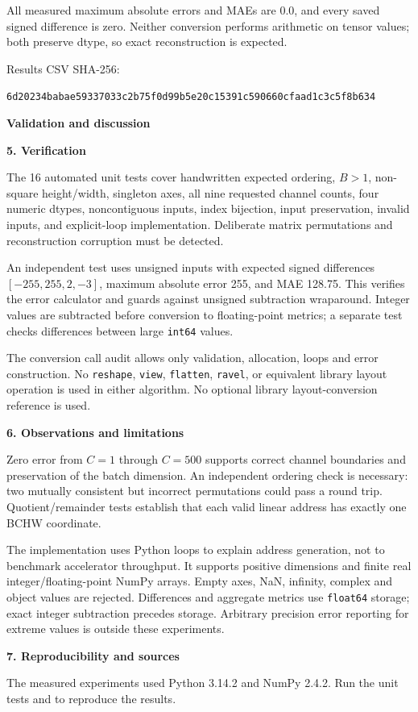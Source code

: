 \documentclass[11pt,a4paper]{article}
\newcommand{\reporttitle}[1]{{\LARGE\sffamily\bfseries\color{navy}#1}\par\medskip}
\newcommand{\reportsection}[1]{{\large\sffamily\bfseries\color{teal}#1}\par}
\newcommand{\ResultsSHA}{6d20234babae59337033c2b75f0d99b5e20c15391c590660cfaad1c3c5f8b634}
\newcommand{\PythonVersion}{3.14.2}
\newcommand{\NumpyVersion}{2.4.2}
\begin{document}
All measured maximum absolute errors and MAEs are 0.0, and every saved signed
difference is zero. Neither conversion performs arithmetic on tensor values;
both preserve dtype, so exact reconstruction is expected.

\vfill
{\footnotesize Results CSV SHA-256:\par\scriptsize\texttt{\ResultsSHA}}

\newpage
\reporttitle{Validation and discussion}
\reportsection{5. Verification}
The 16 automated unit tests cover handwritten expected ordering, $B>1$,
non-square height/width, singleton axes, all nine requested channel counts,
four numeric dtypes, noncontiguous inputs, index bijection, input preservation,
invalid inputs, and explicit-loop implementation. Deliberate matrix permutations
and reconstruction corruption must be detected.

An independent test uses unsigned inputs with expected signed differences
$[-255,255,2,-3]$, maximum absolute error 255, and MAE 128.75.
This verifies the error calculator and guards against unsigned subtraction
wraparound. Integer values are subtracted before conversion to floating-point
metrics; a separate test checks differences between large \texttt{int64} values.

The conversion call audit allows only validation, allocation, loops and error
construction. No \texttt{reshape}, \texttt{view}, \texttt{flatten}, \texttt{ravel},
or equivalent library layout operation is used in either algorithm. No optional
library layout-conversion reference is used.

\reportsection{6. Observations and limitations}
Zero error from $C=1$ through $C=500$ supports correct channel boundaries and
preservation of the batch dimension. An independent ordering check is necessary:
two mutually consistent but incorrect permutations could pass a round trip.
Quotient/remainder tests establish that each valid linear address has exactly
one BCHW coordinate.

The implementation uses Python loops to explain address generation, not to
benchmark accelerator throughput. It supports positive dimensions and finite
real integer/floating-point NumPy arrays. Empty axes, NaN, infinity, complex
and object values are rejected. Differences and aggregate metrics use
\texttt{float64} storage; exact integer subtraction precedes storage. Arbitrary
precision error reporting for extreme values is outside these experiments.

\reportsection{7. Reproducibility and sources}
The measured experiments used Python \PythonVersion{} and NumPy \NumpyVersion{}.
Run the unit tests and  to reproduce the results.
\end{document}

